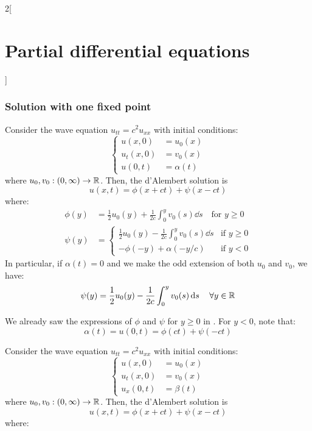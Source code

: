 \documentclass[../../../main_math.tex]{subfiles}
\begin{document}
\begin{multicols}{2}[\section{Partial differential equations}]
  \subsubsection{Solution with one fixed point}
  \begin{proposition}\label{PDE:wave1fixed}
    Consider the wave equation $u_{tt}=c^2u_{xx}$ with initial conditions:
    $$
      \left\{
      \begin{aligned}
        u(x,0)   & =u_0(x)    \\
        u_t(x,0) & =v_0(x)    \\
        u(0,t)   & =\alpha(t)
      \end{aligned}
      \right.
    $$
    where $u_0,v_0:(0,\infty)\rightarrow\mathbb{R}$.
    Then, the d'Alembert solution is $$u(x,t)=\phi(x+ct)+\psi(x-ct)$$ where:
    \begin{align*}
      \phi(y) & =\frac{1}{2}u_0(y)+\frac{1}{2c}\int_0^yv_0(s)\dd{s}\quad\text{for }y\geq 0 \\
      \psi(y) & =
      \begin{cases}
        \displaystyle\frac{1}{2}u_0(y)-\frac{1}{2c}\int_0^yv_0(s)\dd{s} & \text{if } y\geq 0 \\
        \displaystyle -\phi(-y)+\alpha(-y/c)                            & \text{if } y< 0
      \end{cases}
    \end{align*}
    In particular, if $\alpha(t)=0$ and we make the odd extension of both $u_0$ and $v_0$, we have:
    \begin{equation*}
      \psi(y) =\frac{1}{2}u_0(y)-\frac{1}{2c}\int_0^yv_0(s)\dd{s} \quad\forall y\in\mathbb{R}
    \end{equation*}
  \end{proposition}
  \begin{sproof}
    We already saw the expressions of $\phi$ and $\psi$ for $y\geq 0$ in . For $y<0$, note that: $$\alpha(t)=u(0,t)=\phi(ct)+\psi(-ct)$$
  \end{sproof}
  \begin{proposition}
    Consider the wave equation $u_{tt}=c^2u_{xx}$ with initial conditions:
    $$
      \left\{
      \begin{aligned}
        u(x,0)   & =u_0(x)   \\
        u_t(x,0) & =v_0(x)   \\
        u_x(0,t) & =\beta(t)
      \end{aligned}
      \right.
    $$
    where $u_0,v_0:(0,\infty)\rightarrow\mathbb{R}$. Then, the d'Alembert solution is $$u(x,t)=\phi(x+ct)+\psi(x-ct)$$ where:

\end{proposition}
\end{multicols}
\end{document}
